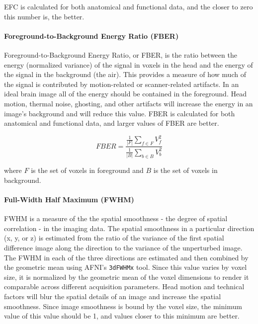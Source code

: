 EFC is calculated for both anatomical and functional data, and the closer to zero this number is, the better.

\paragraph{Foreground-to-Background Energy Ratio (FBER)}
\label{sec:FBER}
Foreground-to-Background Energy Ratio, or FBER, is the ratio between the energy (normalized variance) of the signal in voxels in the head and the energy of the signal in the background (the air). This provides a measure of how much of the signal is contributed by motion-related or scanner-related artifacts. In an ideal brain image all of the energy should be contained in the foreground. Head motion, thermal noise, ghosting, and other artifacts will increase the energy in an image's background and will reduce this value. FBER is calculated for both anatomical and functional data, and larger values of FBER are better.

\begin{equation}
FBER = \frac{\displaystyle\frac{1}{|F|}\sum_{f \in F} V_f^{2}}{\displaystyle\frac{1}{|B|}\sum_{b \in B} V_b^{2}}
\end{equation}

where $F$ is the set of voxels in foreground and $B$ is the set of voxels in background.

\paragraph{Full-Width Half Maximum (FWHM)}
\label{sec:FWHM}

FWHM is a measure of the the spatial smoothness - the degree of spatial correlation - in the imaging data. The spatial smoothness in a particular direction (x, y, or z) is estimated from the ratio of the variance of the first spatial difference image along the direction to the variance of the unperturbed image. The FWHM in each of the three directions are estimated and then combined by the geometric mean using AFNI's \texttt{3dFWHMx} tool. Since this value varies by voxel size, it is normalized by the geometric mean of the voxel dimensions to render it comparable across different acquisition parameters. Head motion and technical factors will blur the spatial details of an image and increase the spatial smoothness. Since image smoothness is bound by the voxel size, the minimum value of this value should be 1, and values closer to this minimum are better. 

